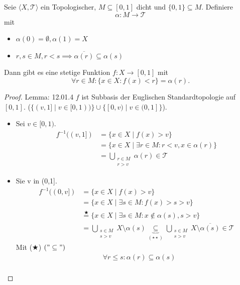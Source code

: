 \mlenma{}
{
    Seie $\langle X, \mathcal{T} \rangle$ ein Topologischer, $M\subseteq [0,1]$ dicht und $\{0,1\} \subseteq M$.
    Definiere $$\alpha : M \to \mathcal{T}$$ mit 
    \begin{itemize}
        \item[(i)] $\alpha(0) = \emptyset, \alpha(1) = X$
        \item[(ii)] $r,s \in M, r < s \implies \overline{\alpha(r)} \subseteq \alpha(s)$ 
    \end{itemize}
    Dann gibt es eine stetige Funktion $f: X \to [0,1]$ mit
    $$\forall r \in M: \{x \in X: f(x) < r\} = \alpha(r).$$
}

\begin{proof}{Lemma: 12.01.4 }
   $f$ ist Subbasis der Euglischen Standardtopologie auf $[0,1]$.
   ($\{(v,1]\mid v \in [0,1))\} \cup \{[0,v)\mid v \in (0,1]\}$).
   \begin{itemize}
    \item Sei $v \in [0,1)$.
    \begin{equation*}
    \begin{split}
    f^{-1}((v,1])  &= \{x \in X \mid f(x) > v\} \\
    &=\{x\in X\mid \exists r \in M: r < v, x \in \alpha(r)\}\\
    &= \bigcup_{\substack{r \in M \\ r > v}} \alpha(r) \in \mathcal{T}
    \end{split}
 \end{equation*}
 \item Sie v in (0,1].
 \begin{equation*}
    \begin{split}
    f^{-1}((0,v])  &= \{x \in X \mid f(x) > v\} \\
    &=\{x\in X\mid \exists s \in M: f(x) > s > v\}\\
    &\overset{\bigstar}{=} \{x \in X \mid \exists s \in M: x \notin \alpha(s), s > v\}\\
    &= \bigcup_{\substack{s \in M \\ s > v}} X\setminus \alpha(s) 
    \underbrace{\subseteq}_{(\star \star)}\bigcup_{\substack{s \in M \\ s > v}}
     X\setminus \overline{\alpha(s)} \in \mathcal{T}
    \end{split}
 \end{equation*}
 Mit ($\bigstar$) $("\subseteq")$ 
 \begin{equation*}
    \begin{split}
    &\forall r \leq s: \alpha(r) \subseteq \alpha(s) \\

\end{split}
\end{equation*}
\end{itemize}
\end{proof}
